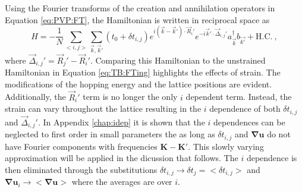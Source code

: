 Using the Fourier transforms of the creation and annihilation operators in Equation \ref{eq:PVP:FT}, the Hamiltonian is written in reciprocal space as 
\begin{equation}
  H=-\frac{1}{N} \sum_{<i,j>} \sum_{\vec{k},\vec{k}'} \left( t_0+\delta t_{i,j} \right)
    e^{i(\vec{k}-\vec{k}')\cdot \vec{R}_i'}
    e^{-i\vec{k}'\cdot \vec{\Delta}_{i,j}'}
    a_{\vec{k}}^{\dagger} b_{\vec{k'}} +\text{H.C.}\ ,
    \label{eq:TB:beforeSV}
\end{equation}
where $\vec{\Delta}_{i,j}'=\vec{R}_j'-\vec{R}_i'$.
Comparing this Hamiltonian to the unstrained Hamiltonian in Equation \ref{eq:TB:FTing} highlights the effects of strain.
The modifications of the hopping energy and the lattice positions are evident.
Additionally, the $\vec{R}_i'$ term is no longer the only $i$ dependent term.
Instead, the strain can vary throughout the lattice resulting in the $i$ dependence of both $\delta t_{i,j}$ and $\vec{\Delta}_{i,j}'$.
In Appendix \ref{chap:idep} it is shown that the $i$ dependences can be neglected to first order in small parameters the as long as $\delta t_{i,j}$ and $\bm{\nabla u}$ do not have Fourier components with frequencies $\bm{K}-\bm{K'}$.
This slowly varying approximation will be applied in the dicussion that follows.
The $i$ dependence is then eliminated through the substitutions $\delta t_{i,j} \rightarrow \delta t_j=<\delta t_{i,j}>$ and $\bm{\nabla u}_i \rightarrow <\bm{\nabla u}>$ where the averages are over $i$. 

